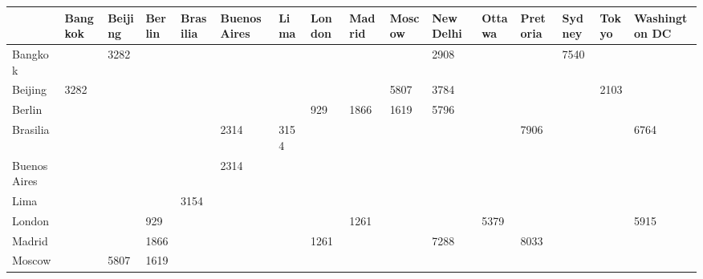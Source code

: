 
\begin{tabular}{l|lllllllllllllll}\hline
              & Bangkok & Beijing & Berlin & Brasilia & Buenos Aires  & Lima & London & Madrid & Moscow & New Delhi & Ottawa & Pretoria & Sydney & Tokyo & Washington DC \\\hline
Bangkok       &         & 3282    &        &          &               &      &        &        &        & 2908      &        &          & 7540   &       &               \\[4pt] 
Beijing       & 3282    &         &        &          &               &      &        &        & 5807   & 3784      &        &          &        & 2103  &               \\[4pt]
Berlin        &         &         &        &          &               &      & 929    & 1866   & 1619   & 5796      &        &          &        &       &               \\[4pt]
Brasilia      &         &         &        &          & 2314          & 3154 &        &        &        &           &        & 7906     &        &       & 6764          \\[4pt]
Buenos Aires  &         &         &        &          & 2314          &      &        &        &        &           &        &          &        &       &               \\[4pt]
Lima          &         &         &        & 3154     &               &      &        &        &        &           &        &          &        &       &               \\[4pt]
London        &         &         & 929    &          &               &      &        & 1261   &        &           & 5379   &          &        &       & 5915          \\[4pt]
Madrid        &         &         & 1866   &          &               &      & 1261   &        &        & 7288      &        & 8033     &        &       &               \\[4pt]
Moscow        &         & 5807    & 1619   &          &               &      &        &        &        &           &        &          &        &       &               \\[4pt]

\end{tabular}
